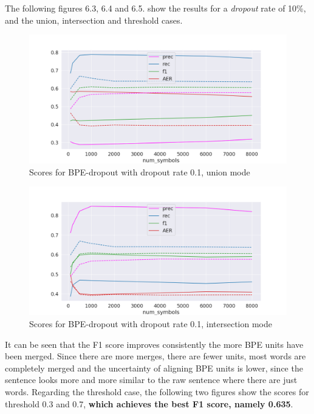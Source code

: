 The following figures 6.3, 6.4 and 6.5. show the results for a \emph{dropout} rate of 10\%, and the union, intersection and threshold cases.

 \begin{figure}[!ht]
     \centering
     \includegraphics[width=13cm]{../reports/scores_dropout_bpe/space/0.1/eng_deu_union_fastalign.png}
     \caption{Scores for BPE-dropout with dropout rate 0.1, union mode}
 \end{figure}
 
 \begin{figure}[!ht]
     \centering
     \includegraphics[width=13cm]{../reports/scores_dropout_bpe/space/0.1/eng_deu_inter_fastalign.png}
     \caption{Scores for BPE-dropout with dropout rate 0.1, intersection mode}
 \end{figure}

It can be seen that the F1 score improves consistently the more BPE units have been merged. Since there are more merges, there are fewer units, most words are completely merged and the uncertainty of aligning BPE units is lower, since the sentence looks more and more similar to the raw sentence where there are just words. Regarding the threshold case, the following two figures show the scores for threshold 0.3 and 0.7, \textbf{which achieves the best F1 score, namely 0.635}.

